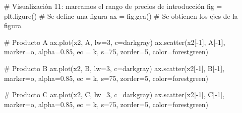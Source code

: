 \documentclass[
  letterpaper,
  DIV=11,
  numbers=noendperiod]{scrreprt}
\newenvironment{Shaded}{\begin{snugshade}}{\end{snugshade}}
\newcommand{\CommentTok}[1]{\textcolor[rgb]{0.37,0.37,0.37}{#1}}
\newcommand{\DecValTok}[1]{\textcolor[rgb]{0.68,0.00,0.00}{#1}}
\newcommand{\FloatTok}[1]{\textcolor[rgb]{0.68,0.00,0.00}{#1}}
\newcommand{\NormalTok}[1]{\textcolor[rgb]{0.00,0.23,0.31}{#1}}
\newcommand{\OperatorTok}[1]{\textcolor[rgb]{0.37,0.37,0.37}{#1}}
\newcommand{\StringTok}[1]{\textcolor[rgb]{0.13,0.47,0.30}{#1}}
\begin{document}
\begin{Shaded}
\begin{Highlighting}[]
\CommentTok{\# Visualización 11: marcamos el rango de precios de introducción}
\NormalTok{fig }\OperatorTok{=}\NormalTok{ plt.figure() }\CommentTok{\# Se define una figura}
\NormalTok{ax }\OperatorTok{=}\NormalTok{ fig.gca()     }\CommentTok{\# Se obtienen los ejes de la figura}

\CommentTok{\# Producto A}
\NormalTok{ax.plot(x2, A, lw}\OperatorTok{=}\DecValTok{3}\NormalTok{, c}\OperatorTok{=}\StringTok{\textquotesingle{}darkgray\textquotesingle{}}\NormalTok{)}
\NormalTok{ax.scatter(x2[}\OperatorTok{{-}}\DecValTok{1}\NormalTok{], A[}\OperatorTok{{-}}\DecValTok{1}\NormalTok{], marker}\OperatorTok{=}\StringTok{\textquotesingle{}o\textquotesingle{}}\NormalTok{, alpha}\OperatorTok{=}\FloatTok{0.85}\NormalTok{, ec }\OperatorTok{=} \StringTok{\textquotesingle{}k\textquotesingle{}}\NormalTok{, s}\OperatorTok{=}\DecValTok{75}\NormalTok{, zorder}\OperatorTok{=}\DecValTok{5}\NormalTok{, color}\OperatorTok{=}\StringTok{\textquotesingle{}forestgreen\textquotesingle{}}\NormalTok{)}

\CommentTok{\# Producto B}
\NormalTok{ax.plot(x2, B, lw}\OperatorTok{=}\DecValTok{3}\NormalTok{, c}\OperatorTok{=}\StringTok{\textquotesingle{}darkgray\textquotesingle{}}\NormalTok{)}
\NormalTok{ax.scatter(x2[}\OperatorTok{{-}}\DecValTok{1}\NormalTok{], B[}\OperatorTok{{-}}\DecValTok{1}\NormalTok{], marker}\OperatorTok{=}\StringTok{\textquotesingle{}o\textquotesingle{}}\NormalTok{, alpha}\OperatorTok{=}\FloatTok{0.85}\NormalTok{, ec }\OperatorTok{=} \StringTok{\textquotesingle{}k\textquotesingle{}}\NormalTok{, s}\OperatorTok{=}\DecValTok{75}\NormalTok{, zorder}\OperatorTok{=}\DecValTok{5}\NormalTok{, color}\OperatorTok{=}\StringTok{\textquotesingle{}forestgreen\textquotesingle{}}\NormalTok{)}

\CommentTok{\# Producto C}
\NormalTok{ax.plot(x2, C, lw}\OperatorTok{=}\DecValTok{3}\NormalTok{, c}\OperatorTok{=}\StringTok{\textquotesingle{}darkgray\textquotesingle{}}\NormalTok{)}
\NormalTok{ax.scatter(x2[}\OperatorTok{{-}}\DecValTok{1}\NormalTok{], C[}\OperatorTok{{-}}\DecValTok{1}\NormalTok{], marker}\OperatorTok{=}\StringTok{\textquotesingle{}o\textquotesingle{}}\NormalTok{, alpha}\OperatorTok{=}\FloatTok{0.85}\NormalTok{, ec }\OperatorTok{=} \StringTok{\textquotesingle{}k\textquotesingle{}}\NormalTok{, s}\OperatorTok{=}\DecValTok{75}\NormalTok{, zorder}\OperatorTok{=}\DecValTok{5}\NormalTok{, color}\OperatorTok{=}\StringTok{\textquotesingle{}forestgreen\textquotesingle{}}\NormalTok{)}


\end{Highlighting}
\end{Shaded}
\end{document}

